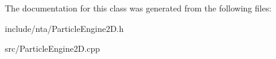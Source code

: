 The documentation for this class was generated from the following files\+:\begin{DoxyCompactItemize}
\item 
include/nta/Particle\+Engine2\+D.\+h\item 
src/Particle\+Engine2\+D.\+cpp\end{DoxyCompactItemize}
